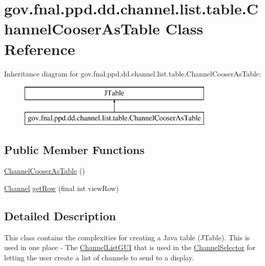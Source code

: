 \hypertarget{classgov_1_1fnal_1_1ppd_1_1dd_1_1channel_1_1list_1_1table_1_1ChannelCooserAsTable}{\section{gov.\-fnal.\-ppd.\-dd.\-channel.\-list.\-table.\-Channel\-Cooser\-As\-Table Class Reference}
\label{classgov_1_1fnal_1_1ppd_1_1dd_1_1channel_1_1list_1_1table_1_1ChannelCooserAsTable}
}
Inheritance diagram for gov.\-fnal.\-ppd.\-dd.\-channel.\-list.\-table.\-Channel\-Cooser\-As\-Table\-:\begin{figure}[H]
\begin{center}
\leavevmode
\includegraphics[height=2.000000cm]{classgov_1_1fnal_1_1ppd_1_1dd_1_1channel_1_1list_1_1table_1_1ChannelCooserAsTable}
\end{center}
\end{figure}
\subsection*{Public Member Functions}
\begin{DoxyCompactItemize}
\item 
\hyperlink{classgov_1_1fnal_1_1ppd_1_1dd_1_1channel_1_1list_1_1table_1_1ChannelCooserAsTable_a3e9192a1e78a896dd27ed80ad78277df}{Channel\-Cooser\-As\-Table} ()
\item 
\hyperlink{interfacegov_1_1fnal_1_1ppd_1_1dd_1_1signage_1_1Channel}{Channel} \hyperlink{classgov_1_1fnal_1_1ppd_1_1dd_1_1channel_1_1list_1_1table_1_1ChannelCooserAsTable_acb5af42a57b27a5bffd85fd6e3a3dbcf}{get\-Row} (final int view\-Row)
\end{DoxyCompactItemize}


\subsection{Detailed Description}
This class contains the complexities for creating a Java table (J\-Table). This is used in one place -\/ The \hyperlink{classgov_1_1fnal_1_1ppd_1_1dd_1_1channel_1_1list_1_1ChannelListGUI}{Channel\-List\-G\-U\-I} that is used in the \hyperlink{classgov_1_1fnal_1_1ppd_1_1dd_1_1ChannelSelector}{Channel\-Selector} for letting the user create a list of channels to send to a display.

